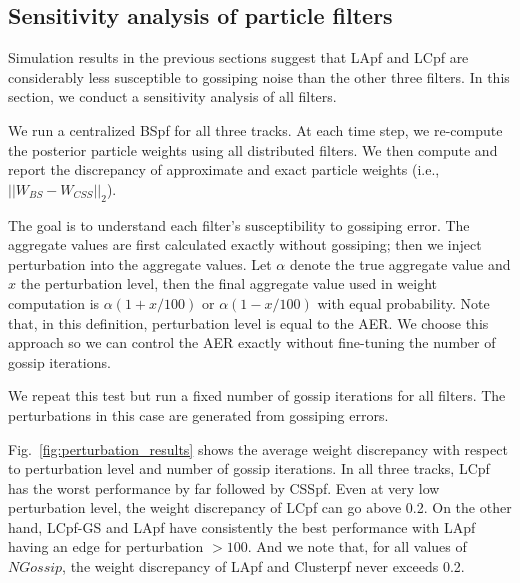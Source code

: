 \documentclass[10pt,letterpaper,final]{article}
\begin{document}
\subsection{Sensitivity analysis of particle filters}
Simulation results in the previous sections suggest that LApf and LCpf are considerably less susceptible to gossiping noise than the other three filters. In this section, we conduct a sensitivity analysis of all filters.

We run a centralized BSpf for all three tracks. At each time step, we re-compute the posterior particle weights using all distributed filters. We then compute and report the discrepancy of approximate and exact particle weights (i.e., $||W_{BS}-W_{CSS}||_2$).

The goal is to understand each filter's susceptibility to gossiping error. The aggregate values are first calculated exactly without gossiping; then we inject perturbation into the aggregate values. Let $\alpha$ denote the true aggregate value and $x$ the perturbation level, then the final aggregate value used in weight computation is $\alpha(1+ x/100)$ or $\alpha(1- x/100)$ with equal probability. Note that, in this definition, perturbation level is equal to the AER. We choose this approach so we can control the AER exactly without fine-tuning the number of gossip iterations. 

We repeat this test but run a fixed number of gossip iterations for all filters. The perturbations in this case are generated from gossiping errors. 

Fig.~\ref{fig:perturbation_results} shows the average weight discrepancy with respect to perturbation level and number of gossip iterations. In all three tracks, LCpf has the worst performance by far followed by CSSpf. Even at very low perturbation level, the weight discrepancy of LCpf can go above 0.2. On the other hand, LCpf-GS and LApf have consistently the best performance with LApf having an edge for perturbation $>100$. And we note that, for all values of $NGossip$, the weight discrepancy of LApf and Clusterpf never exceeds 0.2. 
\end{document}
